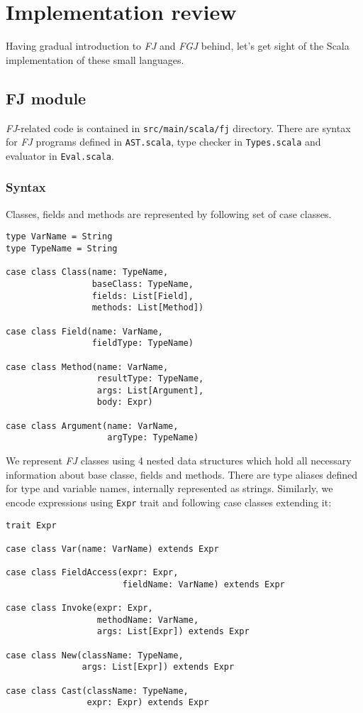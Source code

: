 \documentclass{article}[12pt]
\begin{document}
\section{Implementation review}

Having gradual introduction to \emph{FJ} and \emph{FGJ} behind, let's get sight of the Scala implementation of these small languages.

\subsection{FJ module}

\emph{FJ}-related code is contained in \texttt{src/main/scala/fj} directory. There are syntax for \emph{FJ} programs defined in \texttt{AST.scala}, type checker in \texttt{Types.scala} and evaluator in \texttt{Eval.scala}.

\subsubsection{Syntax}

Classes, fields and methods are represented by following set of case classes.

\begin{verbatim}
type VarName = String
type TypeName = String

case class Class(name: TypeName,
                 baseClass: TypeName,
                 fields: List[Field],
                 methods: List[Method])

case class Field(name: VarName,
                 fieldType: TypeName)

case class Method(name: VarName,
                  resultType: TypeName,
                  args: List[Argument],
                  body: Expr)

case class Argument(name: VarName,
                    argType: TypeName)
\end{verbatim}

We represent \emph{FJ} classes using 4 nested data structures which hold all necessary information about base classe, fields and methods. There are type aliases defined for type and variable names, internally represented as strings. Similarly, we encode expressions using \texttt{Expr} trait and following case classes extending it:

\begin{verbatim}
trait Expr

case class Var(name: VarName) extends Expr

case class FieldAccess(expr: Expr,
                       fieldName: VarName) extends Expr

case class Invoke(expr: Expr,
                  methodName: VarName,
                  args: List[Expr]) extends Expr

case class New(className: TypeName,
               args: List[Expr]) extends Expr

case class Cast(className: TypeName,
                expr: Expr) extends Expr
\end{verbatim}
\end{document}
